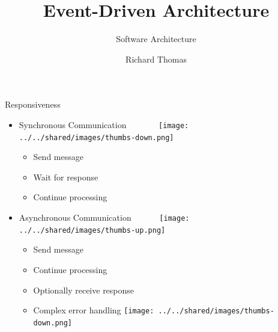 \documentclass{slide}
\title{Event-Driven Architecture}
\subtitle{Software Architecture}
\author{Richard Thomas}
\date{\week{6}}
\begin{document}
\maketitle




\begin{frame}{Responsiveness}
    \vspace{1mm}
    {\LARGE
    \begin{itemize}
        \item Synchronous Communication ~~~~~~~\texttt{[image: ../../shared/images/thumbs-down.png]}
        \begin{itemize}
            \Large\item Send message
            \Large\item Wait for response
            \Large\item Continue processing
        \end{itemize}
        \vspace{3mm}
        \item<2-> Asynchronous Communication ~~~~~~\texttt{[image: ../../shared/images/thumbs-up.png]}
        \begin{itemize}
            \Large\item Send message
            \Large\item Continue processing
            \Large\item Optionally receive response
            \Large\item Complex error handling \tabto{16em}\texttt{[image: ../../shared/images/thumbs-down.png]}
	\end{itemize}
    \end{itemize}
    }
\end{frame}

\end{document}
